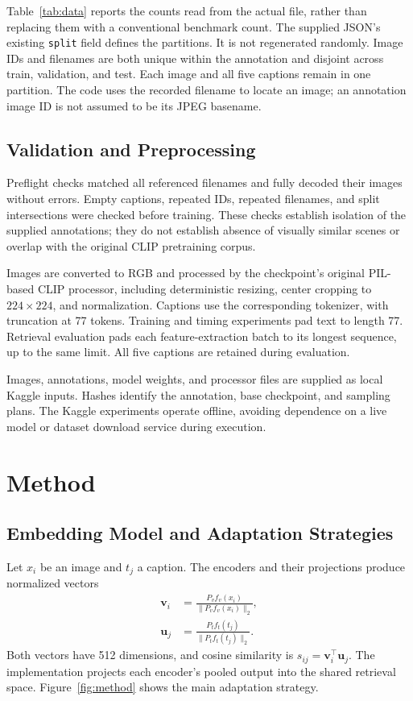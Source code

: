 \documentclass[conference]{IEEEtran}
\begin{document}
Table~\ref{tab:data} reports the counts read from the actual file, rather than replacing them with a conventional benchmark count. The supplied JSON's existing \texttt{split} field defines the partitions. It is not regenerated randomly. Image IDs and filenames are both unique within the annotation and disjoint across train, validation, and test. Each image and all five captions remain in one partition. The code uses the recorded filename to locate an image; an annotation image ID is not assumed to be its JPEG basename.

\subsection{Validation and Preprocessing}
Preflight checks matched all referenced filenames and fully decoded their images without errors. Empty captions, repeated IDs, repeated filenames, and split intersections were checked before training. These checks establish isolation of the supplied annotations; they do not establish absence of visually similar scenes or overlap with the original CLIP pretraining corpus.

Images are converted to RGB and processed by the checkpoint's original PIL-based CLIP processor, including deterministic resizing, center cropping to $224\times224$, and normalization. Captions use the corresponding tokenizer, with truncation at 77 tokens. Training and timing experiments pad text to length 77. Retrieval evaluation pads each feature-extraction batch to its longest sequence, up to the same limit. All five captions are retained during evaluation.

Images, annotations, model weights, and processor files are supplied as local Kaggle inputs. Hashes identify the annotation, base checkpoint, and sampling plans. The Kaggle experiments operate offline, avoiding dependence on a live model or dataset download service during execution.

\section{Method}
\subsection{Embedding Model and Adaptation Strategies}
Let $x_i$ be an image and $t_j$ a caption. The encoders and their projections produce normalized vectors
\begin{align}
\mathbf v_i &= \frac{P_v f_v(x_i)}{\|P_v f_v(x_i)\|_2},\\
\mathbf u_j &= \frac{P_t f_t(t_j)}{\|P_t f_t(t_j)\|_2}.
\end{align}
Both vectors have 512 dimensions, and cosine similarity is $s_{ij}=\mathbf v_i^\top\mathbf u_j$. The implementation projects each encoder's pooled output into the shared retrieval space. Figure~\ref{fig:method} shows the main adaptation strategy.
\end{document}

